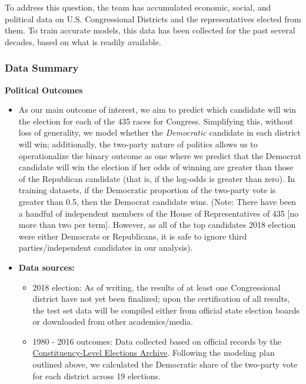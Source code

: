 \documentclass[11pt]{article}
\providecommand{\tightlist}{%
      \setlength{\itemsep}{0pt}\setlength{\parskip}{0pt}}
\begin{document}
To address this question, the team has accumulated economic, social, and
political data on U.S. Congressional Districts and the representatives
elected from them. To train accurate models, this data has been
collected for the past several decades, based on what is readily
available.

\subsubsection{Data Summary}\label{data-summary}

\textbf{Political Outcomes}

\begin{itemize}
\tightlist
\item
  As our main outcome of interest, we aim to predict which candidate
  will win the election for each of the 435 races for Congress.
  Simplifying this, without loss of generality, we model whether the
  \emph{Democratic} candidate in each district will win; additionally,
  the two-party nature of politics allows us to operationalize the
  binary outcome as one where we predict that the Democrat candidate
  will win the election if her odds of winning are greater than those of
  the Republican candidate (that is, if the log-odds is greater than
  zero). In training datasets, if the Democratic proportion of the
  two-party vote is greater than 0.5, then the Democrat candidate wins.
  (Note: There have been a handful of independent members of the House
  of Representatives of 435 {[}no more than two per term{]}. However, as
  all of the top candidates 2018 election were either Democrats or
  Republicans, it is safe to ignore third parties/independent candidates
  in our analysis).
\item
  \textbf{Data sources:}

  \begin{itemize}
  \tightlist
  \item
    2018 election: As of writing, the results of at least one
    Congressional district have not yet been finalized; upon the
    certification of all results, the test set data will be compiled
    either from official state election boards or downloaded from other
    academics/media.
  \item
    1980 - 2016 outcomes: Data collected based on official records by
    the \href{http://www.electiondataarchive.org/}{Constituency-Level
    Elections Archive}. Following the modeling plan outlined above, we
    calculated the Democratic share of the two-party vote for each
    district across 19 elections.
  \end{itemize}
\end{itemize}
\end{document}
